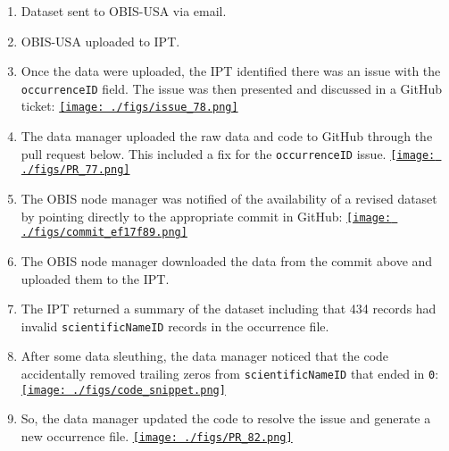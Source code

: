 \documentclass[
]{book}
\providecommand{\tightlist}{%
  \setlength{\itemsep}{0pt}\setlength{\parskip}{0pt}}
\begin{document}
\begin{enumerate}
\def\labelenumi{\arabic{enumi}.}
\tightlist
\item
  Dataset sent to OBIS-USA via email.
\item
  OBIS-USA uploaded to IPT.
\item
  Once the data were uploaded, the IPT identified there was an issue with the \texttt{occurrenceID} field. The issue was then
  presented and discussed in a GitHub ticket:
  \href{https://github.com/ioos/bio_data_guide/issues/78}{\texttt{[image: ./figs/issue\_78.png]}}
\item
  The data manager uploaded the raw data and code to GitHub through the pull request below. This included a fix for
  the \texttt{occurrenceID} issue.
  \href{https://github.com/ioos/bio_data_guide/pull/77}{\texttt{[image: ./figs/PR\_77.png]}}
\item
  The OBIS node manager was notified of the availability of a revised dataset by pointing directly to the appropriate
  commit in GitHub:
  \href{https://github.com/ioos/bio_data_guide/commit/ef17f89f23316a6227fdf58de509582bd9854a55}{\texttt{[image: ./figs/commit\_ef17f89.png]}}
\item
  The OBIS node manager downloaded the data from the commit above and uploaded them to the IPT.
\item
  The IPT returned a summary of the dataset including that 434 records had invalid \texttt{scientificNameID} records in the
  occurrence file.
\item
  After some data sleuthing, the data manager noticed that the code accidentally removed trailing zeros from
  \texttt{scientificNameID} that ended in \texttt{0}:
  \href{https://nbviewer.org/github/ioos/bio_data_guide/blob/ef17f89f23316a6227fdf58de509582bd9854a55/datasets/AMBON_zooplankton/2017zooplanton_to_dwc\%282\%29_mmb.ipynb\#END-of-ID-generation}{\texttt{[image: ./figs/code\_snippet.png]}}
\item
  So, the data manager updated the code to resolve the issue and generate a new occurrence file.
  \href{https://github.com/ioos/bio_data_guide/pull/82}{\texttt{[image: ./figs/PR\_82.png]}}


\end{enumerate}
\end{document}
